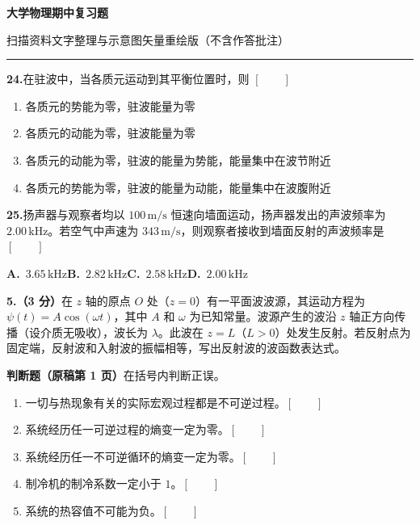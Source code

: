\documentclass[12pt,a4paper,UTF8]{ctexart}
\newcommand{\qitem}[1]{\par\needspace{5\baselineskip}\smallskip\noindent\textbf{#1}\hspace{0.5em}}
\newcommand{\tfbox}{\ensuremath{[\quad\quad]}}
\newcommand{\sourcepage}[1]{\par\medskip\noindent{\small\bfseries 原稿第 #1 页}\par\vspace{-0.2em}\hrule\smallskip}
\begin{document}
\begin{center}
{\LARGE\bfseries 大学物理期中复习题}\par\vspace{0.25em}
{\small 扫描资料文字整理与示意图矢量重绘版（不含作答批注）}
\end{center}
\vspace{-0.55em}

\sourcepage{1}
\qitem{24.}在驻波中，当各质元运动到其平衡位置时，则 \tfbox
\begin{enumerate}[label=\Alph*.,leftmargin=2.3em]
\item 各质元的势能为零，驻波能量为零
\item 各质元的动能为零，驻波能量为零
\item 各质元的动能为零，驻波的能量为势能，能量集中在波节附近
\item 各质元的势能为零，驻波的能量为动能，能量集中在波腹附近
\end{enumerate}

\qitem{25.}扬声器与观察者均以 $100\,\mathrm{m/s}$ 恒速向墙面运动，扬声器发出的声波频率为 $2.00\,\mathrm{kHz}$。若空气中声速为 $343\,\mathrm{m/s}$，则观察者接收到墙面反射的声波频率是 \tfbox
\par\noindent\hspace*{1.5em}\textbf{A.}\ $3.65\,\mathrm{kHz}$\qquad \textbf{B.}\ $2.82\,\mathrm{kHz}$\qquad \textbf{C.}\ $2.58\,\mathrm{kHz}$\qquad \textbf{D.}\ $2.00\,\mathrm{kHz}$

\qitem{5.（3 分）}在 $z$ 轴的原点 $O$ 处（$z=0$）有一平面波波源，其运动方程为 $\psi(t)=A\cos(\omega t)$，其中 $A$ 和 $\omega$ 为已知常量。波源产生的波沿 $z$ 轴正方向传播（设介质无吸收），波长为 $\lambda$。此波在 $z=L$（$L>0$）处发生反射。若反射点为固定端，反射波和入射波的振幅相等，写出反射波的波函数表达式。
\vspace{0.22cm}

\noindent\textbf{判断题（原稿第 1 页）}\quad 在括号内判断正误。
\begin{enumerate}[label=\arabic*.,leftmargin=2.3em]
\item 一切与热现象有关的实际宏观过程都是不可逆过程。\tfbox
\item 系统经历任一可逆过程的熵变一定为零。\tfbox
\item 系统经历任一不可逆循环的熵变一定为零。\tfbox
\item 制冷机的制冷系数一定小于 $1$。\tfbox
\item 系统的热容值不可能为负。\tfbox
\end{enumerate}
\end{document}

